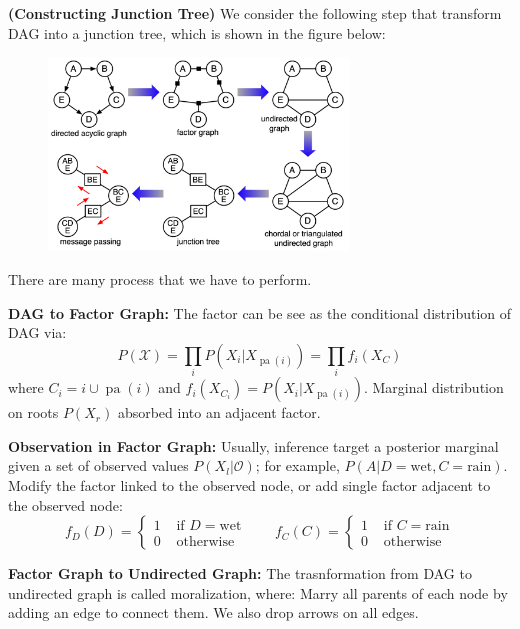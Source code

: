 \begin{definition}{\textbf{(Constructing Junction Tree)}}
    We consider the following step that transform DAG into a junction tree, which is shown in the figure below:
    \begin{figure}[H]
        \centering
        \includegraphics[width=8cm]{img/img9.png}
    \end{figure}  
    There are many process that we have to perform. 

    \textbf{DAG to Factor Graph:} The factor can be see as the conditional distribution of DAG via:
    \begin{equation*}
        P(\mathcal{X}) = \prod_iP(X_i|X_{\operatorname{pa}(i)}) = \prod_if_i(X_C)
    \end{equation*}
    where $C_i = i\cup \operatorname{pa}(i)$ and $f_i(X_{C_i}) = P(X_i|X_{\operatorname{pa}(i)})$. Marginal distribution on roots $P(X_r)$ absorbed into an adjacent factor.

    \textbf{Observation in Factor Graph:} Usually, inference target a posterior marginal given a set of observed values $P(X_l|\mathcal{O})$; for example, $P(A | D =\text{wet}, C = \text{rain})$. Modify the factor linked to the observed node, or add single factor adjacent to the observed node:
    \begin{equation*}
        f_D(D) = \begin{cases}
            1 &\text{ if } D = \text{wet} \\
            0 &\text{ otherwise }
        \end{cases} \qquad f_C(C) = \begin{cases}
            1 &\text{ if } C = \text{rain} \\
            0 &\text{ otherwise }
        \end{cases}
    \end{equation*}
    
    \textbf{Factor Graph to Undirected Graph:} The trasnformation from DAG to undirected graph is called moralization, where: Marry all parents of each node by adding an edge to connect them. We also drop arrows on all edges. 


\end{definition}
